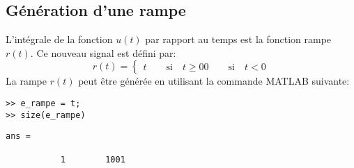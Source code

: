 \subsection{Génération d'une rampe}
L'intégrale de la fonction $u(t)$ par rapport au temps est la fonction rampe 
$r(t)$. Ce nouveau signal est défini par:
\[
    r(t)=\begin{cases}
        t \qquad \textrm{si} \quad  t\geq 0
        0 \qquad \textrm{si} \quad  t<0
         \end{cases}
\]
La rampe $r(t)$ peut être générée en utilisant la commande MATLAB suivante:
\begin{verbatim}
>> e_rampe = t;
>> size(e_rampe)
\end{verbatim}
\begin{verbatim}
ans =

           1        1001
\end{verbatim}
